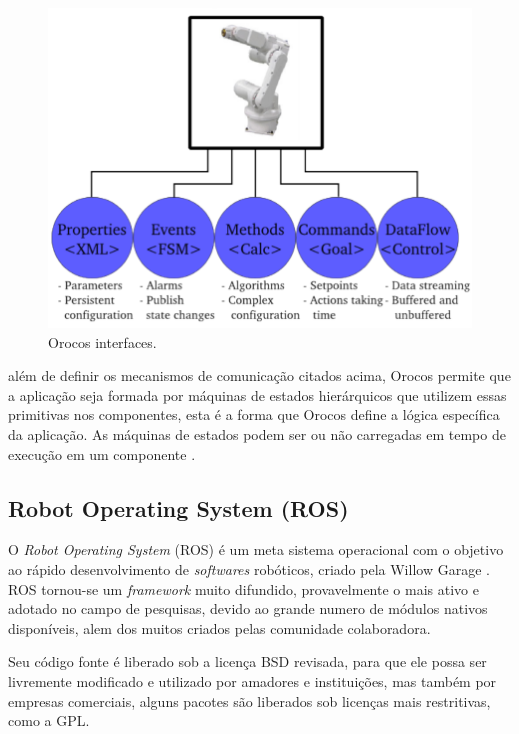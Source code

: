 \documentclass[conference]{IEEEtran}
\begin{document}
\begin{figure}[h]
	\centering
	\includegraphics[scale=0.22]{files/orocos_network.png}
	\caption{Orocos interfaces.  \cite{Orocos_manual}}
	\label{fig:orocos_network}
\end{figure}

além de definir os mecanismos de comunicação citados acima, Orocos permite que a aplicação seja formada por máquinas de estados hierárquicos que utilizem essas primitivas nos componentes, esta é a forma que Orocos define a lógica específica da aplicação. As máquinas de estados podem ser ou não carregadas em tempo de execução em um componente \cite{Orocos_Cobem}.


\subsection{Robot Operating System (ROS)}\label{subsec:ros}

O \textit{Robot Operating System} (ROS) é um meta sistema operacional com o objetivo ao rápido desenvolvimento de \textit{softwares} robóticos, criado pela Willow Garage \cite{willow_ROS}. ROS tornou-se um \textit{framework} muito difundido, provavelmente o mais ativo e adotado no campo de pesquisas, devido ao grande numero de módulos nativos disponíveis, alem dos muitos criados pelas comunidade colaboradora. 	%

Seu código fonte é liberado sob a licença BSD revisada, para que ele possa ser livremente modificado e utilizado por amadores e instituições, mas também por empresas comerciais, alguns pacotes são liberados sob licenças mais restritivas, como a GPL.
\end{document}
